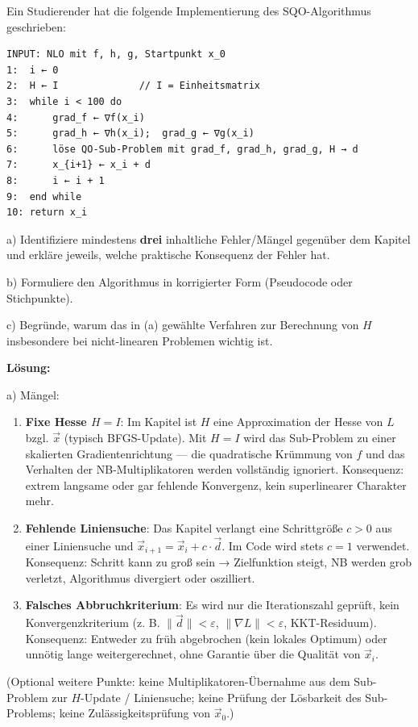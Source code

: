 \documentclass[11pt, a4paper]{article}
\begin{document}
Ein Studierender hat die folgende Implementierung des SQO-Algorithmus geschrieben:


\begin{lstlisting}
INPUT: NLO mit f, h, g, Startpunkt x_0
1:  i ← 0
2:  H ← I              // I = Einheitsmatrix
3:  while i < 100 do
4:      grad_f ← ∇f(x_i)
5:      grad_h ← ∇h(x_i);  grad_g ← ∇g(x_i)
6:      löse QO-Sub-Problem mit grad_f, grad_h, grad_g, H → d
7:      x_{i+1} ← x_i + d
8:      i ← i + 1
9:  end while
10: return x_i
\end{lstlisting}


a) Identifiziere mindestens \textbf{drei} inhaltliche Fehler/Mängel gegenüber dem Kapitel und erkläre jeweils, welche praktische Konsequenz der Fehler hat.

b) Formuliere den Algorithmus in korrigierter Form (Pseudocode oder Stichpunkte).

c) Begründe, warum das in (a) gewählte Verfahren zur Berechnung von $H$ insbesondere bei nicht-linearen Problemen wichtig ist.


\textbf{Lösung:}


a) Mängel:


\begin{enumerate}
  \item \textbf{Fixe Hesse $H = I$}: Im Kapitel ist $H$ eine Approximation der Hesse von $L$ bzgl. $\vec{x}$ (typisch BFGS-Update). Mit $H = I$ wird das Sub-Problem zu einer skalierten Gradientenrichtung — die quadratische Krümmung von $f$ und das Verhalten der NB-Multiplikatoren werden vollständig ignoriert. Konsequenz: extrem langsame oder gar fehlende Konvergenz, kein superlinearer Charakter mehr.
  \item \textbf{Fehlende Liniensuche}: Das Kapitel verlangt eine Schrittgröße $c > 0$ aus einer Liniensuche und $\vec{x}_{i+1} = \vec{x}_i + c\cdot\vec{d}$. Im Code wird stets $c=1$ verwendet. Konsequenz: Schritt kann zu groß sein → Zielfunktion steigt, NB werden grob verletzt, Algorithmus divergiert oder oszilliert.
  \item \textbf{Falsches Abbruchkriterium}: Es wird nur die Iterationszahl geprüft, kein Konvergenzkriterium (z. B. $\|\vec{d}\| < \varepsilon$, $\|\nabla L\| < \varepsilon$, KKT-Residuum). Konsequenz: Entweder zu früh abgebrochen (kein lokales Optimum) oder unnötig lange weitergerechnet, ohne Garantie über die Qualität von $\vec{x}_i$.
\end{enumerate}

(Optional weitere Punkte: keine Multiplikatoren-Übernahme aus dem Sub-Problem zur $H$-Update / Liniensuche; keine Prüfung der Lösbarkeit des Sub-Problems; keine Zulässigkeitsprüfung von $\vec{x}_0$.)
\end{document}
